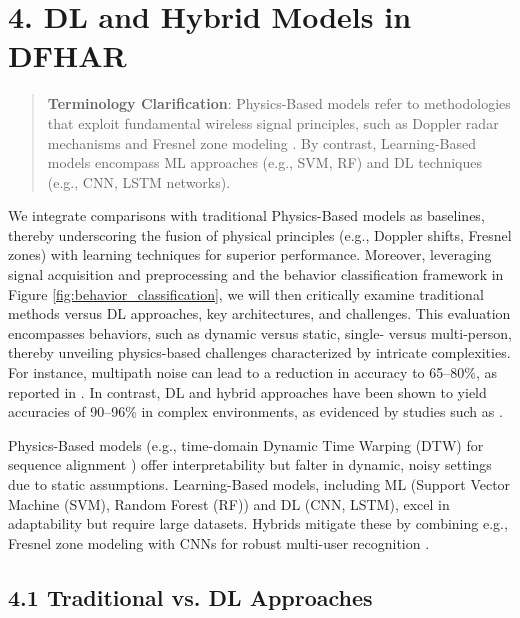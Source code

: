 \documentclass[Afour,sageh,times]{sagej}
\begin{document}
\section{4. DL and Hybrid Models in DFHAR}
\label{sec:dl_models}

\begin{quote}
\noindent \textbf{Terminology Clarification}: Physics-Based models refer to methodologies that exploit fundamental wireless signal principles, such as Doppler radar mechanisms and Fresnel zone modeling \citep{guo2019robust}. By contrast, Learning-Based models encompass ML approaches (e.g., SVM, RF) and DL techniques (e.g., CNN, LSTM networks)\citep{yan2020wiact}.
\end{quote}

We integrate comparisons with traditional Physics-Based models as baselines, thereby underscoring the fusion of physical principles (e.g., Doppler shifts, Fresnel zones) with learning techniques for superior performance. 
Moreover, leveraging signal acquisition and preprocessing and the behavior classification framework in Figure \ref{fig:behavior_classification}, we will then critically examine traditional methods versus DL approaches, key architectures, and challenges. This evaluation encompasses behaviors, such as dynamic versus static, single- versus multi-person, thereby unveiling physics-based challenges characterized by intricate complexities. For instance, multipath noise can lead to a reduction in accuracy to 65–80\%, as reported in  \citep{guo2019robust}. In contrast, DL and hybrid approaches have been shown to yield accuracies of 90–96\% in complex environments, as evidenced by studies such as \citep{yang2022deep, wang2022caution, chen2018wifi}.

Physics-Based models (e.g., time-domain Dynamic Time Warping (DTW) for sequence alignment \citep{wang2016gait}) offer interpretability but falter in dynamic, noisy settings due to static assumptions. Learning-Based models, including ML (Support Vector Machine (SVM), Random Forest (RF)) and DL (CNN, LSTM), excel in adaptability but require large datasets. Hybrids mitigate these by combining e.g., Fresnel zone modeling with CNNs for robust multi-user recognition \citep{zou2019wifi}.

\subsection{4.1 Traditional vs. DL Approaches}
\label{subsec:traditional_vs_dl}
\end{document}
